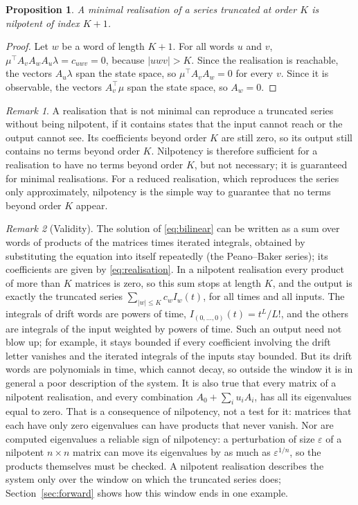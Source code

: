 \documentclass[11pt,a4paper]{article}
\newtheorem{proposition}{Proposition}
\theoremstyle{remark}
\newtheorem{remark}{Remark}
\begin{document}
\begin{proposition}\label{prop:minimal}
A minimal realisation of a series truncated at order $K$ is nilpotent of index $K+1$.
\end{proposition}
\begin{proof}
Let $w$ be a word of length $K+1$.
For all words $u$ and $v$, $\mu^\top A_vA_wA_u\lambda=c_{uwv}=0$, because $|uwv|>K$.
Since the realisation is reachable, the vectors $A_u\lambda$ span the state space, so $\mu^\top A_vA_w=0$ for every $v$.
Since it is observable, the vectors $A_v^\top\mu$ span the state space, so $A_w=0$.
\end{proof}

\begin{remark}
A realisation that is not minimal can reproduce a truncated series without being nilpotent, if it contains states that the input cannot reach or the output cannot see.
Its coefficients beyond order $K$ are still zero, so its output still contains no terms beyond order $K$.
Nilpotency is therefore sufficient for a realisation to have no terms beyond order $K$, but not necessary; it is guaranteed for minimal realisations.
For a reduced realisation, which reproduces the series only approximately, nilpotency is the simple way to guarantee that no terms beyond order $K$ appear.
\end{remark}

\begin{remark}[Validity]
The solution of \eqref{eq:bilinear} can be written as a sum over words of products of the matrices times iterated integrals, obtained by substituting the equation into itself repeatedly (the Peano--Baker series); its coefficients are given by \eqref{eq:realisation}.
In a nilpotent realisation every product of more than $K$ matrices is zero, so this sum stops at length $K$, and the output is exactly the truncated series $\sum_{|w|\le K}c_wI_w(t)$, for all times and all inputs.
The integrals of drift words are powers of time, $I_{(0,\dots,0)}(t)=t^L/L!$, and the others are integrals of the input weighted by powers of time.
Such an output need not blow up; for example, it stays bounded if every coefficient involving the drift letter vanishes and the iterated integrals of the inputs stay bounded.
But its drift words are polynomials in time, which cannot decay, so outside the window it is in general a poor description of the system.
It is also true that every matrix of a nilpotent realisation, and every combination $A_0+\sum_iu_iA_i$, has all its eigenvalues equal to zero.
That is a consequence of nilpotency, not a test for it: matrices that each have only zero eigenvalues can have products that never vanish.
Nor are computed eigenvalues a reliable sign of nilpotency: a perturbation of size $\varepsilon$ of a nilpotent $n\times n$ matrix can move its eigenvalues by as much as $\varepsilon^{1/n}$, so the products themselves must be checked.
A nilpotent realisation describes the system only over the window on which the truncated series does; Section~\ref{sec:forward} shows how this window ends in one example.
\end{remark}
\end{document}
